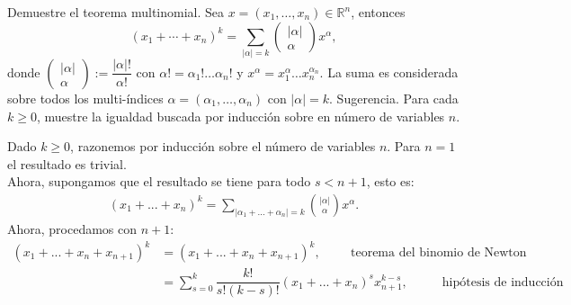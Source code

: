 
\usepackage{amsmath}
\usepackage{geometry}
\usepackage{tikz}
\usepackage{float}
\usepackage{graphics}
\usepackage{cancel}
\providecommand{\abs}[1]{\lvert#1\rvert}
\providecommand{\norm}[1]{\lVert#1\rVert}




\maketitle
\thispagestyle{empty}
\newpage

\begin{homeworkProblem}
Demuestre el teorema multinomial. Sea $x=\left(x_1, \ldots, x_n\right) \in \mathbb{R}^n$, entonces
$$
\left(x_1+\cdots+x_n\right)^k=\sum_{|\alpha|=k}\left(\begin{array}{c}
|\alpha| \\
\alpha
\end{array}\right) x^\alpha,
$$
donde $\left(\begin{array}{c}|\alpha| \\ \alpha\end{array}\right):=\dfrac{|\alpha| !}{\alpha !}$ con $\alpha !=\alpha_{1} ! \ldots \alpha_{n} !$ y $x^\alpha=x_1^\alpha \ldots x_n^{\alpha_n}$. La suma es considerada sobre todos los multi-índices $\alpha=\left(\alpha_1, \ldots, \alpha_n\right)$ con $|\alpha|=k$.
Sugerencia. Para cada $k \geq 0$, muestre la igualdad buscada por inducción sobre en número de variables $n$.\\
    \begin{solucion}
        Dado $k \geq 0 $, razonemos por inducción sobre el número de variables $n$. Para $n = 1$ el resultado es trivial. \\
        Ahora, supongamos que el resultado se tiene para todo $s<n+1$, esto es:
        \begin{align*}
            (x_{1}+...+x_{n})^{k} = \displaystyle \sum_{\abs{\alpha_{1} + ... + \alpha_{n}} = k} \binom{\abs{\alpha}}{\alpha} x^{\alpha}.
        \end{align*}
        Ahora, procedamos con $n+1:$
        \begin{align*}
            (x_{1}+...+x_{n}+x_{n+1})^{k}  &= (x_{1}+...+x_{n}+x_{n+1})^{k}, \hspace{1cm} \text{teorema del binomio de Newton}\\
                                        & = \displaystyle \sum_{s=0}^{k} \dfrac{k!}{s!(k-s)!} (x_{1}+...+x_{n})^s x_{n+1}^{k-s}, \hspace{1cm} \text{ hipótesis de inducción}\\

\end{align*}
\end{solucion}
\end{homeworkProblem}
